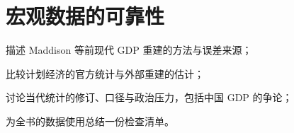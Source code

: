 \chapter{宏观数据的可靠性}\label{ch:datareliability}

\begin{chapterguide}
\begin{guidegoals}
\item 描述 Maddison 等前现代 GDP 重建的方法与误差来源；
\item 比较计划经济的官方统计与外部重建的估计；
\item 讨论当代统计的修订、口径与政治压力，包括中国 GDP 的争论；
\item 为全书的数据使用总结一份检查清单。
\end{guidegoals}
\end{chapterguide}

\chapterstub
